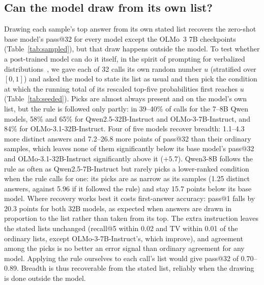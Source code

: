\documentclass[wcp]{jmlr}
\begin{document}
\subsection{Can the model draw from its own list?}\label{sec:seeded}
Drawing each sample's top answer from its own stated list recovers the zero-shot base model's pass@32 for every model except the OLMo~3 7B checkpoints (Table~\ref{tab:sampled}), but that draw happens outside the model. To test whether a post-trained model can do it itself, in the spirit of prompting for verbalized distributions~\citep{zhang2025verbalized}, we gave each of 32 calls its own random number $u$ (stratified over $[0,1]$) and asked the model to state its list as usual and then pick the condition at which the running total of its rescaled top-five probabilities first reaches $u$ (Table~\ref{tab:seeded}). Picks are almost always present and on the model's own list, but the rule is followed only partly: in 39--40\% of calls for the 7--8B Qwen models, 58\% and 65\% for Qwen2.5-32B-Instruct and OLMo-3-7B-Instruct, and 84\% for OLMo-3.1-32B-Instruct. Four of five models recover breadth: 1.1--4.3 more distinct answers and 7.2--26.8 more points of pass@32 than their ordinary samples, which leaves none of them significantly below its base model's pass@32 and OLMo-3.1-32B-Instruct significantly above it ($+5.7$). Qwen3-8B follows the rule as often as Qwen2.5-7B-Instruct but rarely picks a lower-ranked condition when the rule calls for one: its picks are as narrow as its samples (1.25 distinct answers, against 5.96 if it followed the rule) and stay 15.7 points below its base model. Where recovery works best it costs first-answer accuracy: pass@1 falls by 20.3 points for both 32B models, as expected when answers are drawn in proportion to the list rather than taken from its top. The extra instruction leaves the stated lists unchanged (recall@5 within 0.02 and TV within 0.01 of the ordinary lists, except OLMo-3-7B-Instruct's, which improve), and agreement among the picks is no better an error signal than ordinary agreement for any model. Applying the rule ourselves to each call's list would give pass@32 of 0.70--0.89. Breadth is thus recoverable from the stated list, reliably when the drawing is done outside the model.
\end{document}
